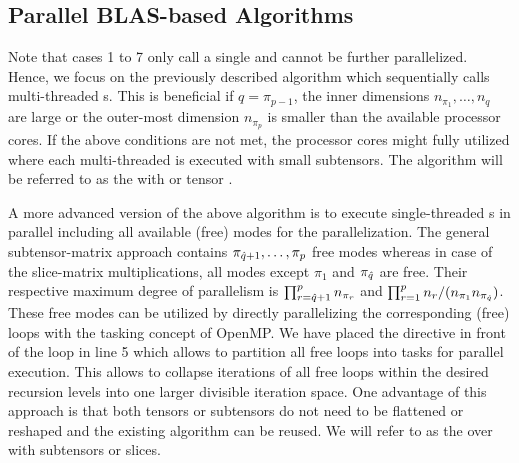  
\subsection{Parallel BLAS-based Algorithms}
\label{subsec:parallel.multi-loops}
Note that cases 1 to 7 only call a single  and cannot be further parallelized.
Hence, we focus on the previously described algorithm which sequentially calls multi-threaded s.
This is beneficial if $q = \pi_{p-1}$, the inner dimensions $n_{\pi_1},\dots,n_{q}$ are large or the outer-most dimension $n_{\pi_{p}}$ is smaller than the available processor cores.
If the above conditions are not met, the processor cores might fully utilized where each multi-threaded  is executed with small subtensors.
The algorithm will be referred to as the   with  or tensor .

A more advanced version of the above algorithm is to execute single-threaded s in parallel including all available (free) modes for the parallelization.
The general subtensor-matrix approach contains $\pi_{\hat{q}+1}, \dots, \pi_{p}$ free modes whereas in case of the slice-matrix multiplications, all modes except $\pi_1$ and $\pi_{\hat{q}}$ are free.
Their respective maximum degree of parallelism is $\prod_{r=\hat{q}+1}^{p} n_{\pi_r}$ and $\prod_{r=1}^{p} n_{r} / (n_{\pi_1} n_{\pi_{\hat{q}}})$.
These free modes can be utilized by directly parallelizing the corresponding (free) loops with the tasking concept of OpenMP. 
We have placed the  directive in front of the loop in line 5 which allows to partition all free loops into tasks for parallel execution.
This allows to collapse iterations of all free loops within the desired recursion levels into one larger divisible iteration space.
One advantage of this approach is that both tensors or subtensors do not need to be flattened or reshaped and the existing algorithm can be reused.
We will refer to as the  over   with subtensors or slices.

